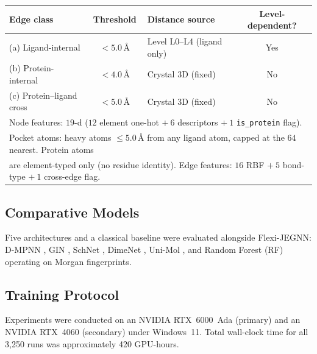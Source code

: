 \documentclass[pdflatex,sn-vancouver-num]{sn-jnl}%
\theoremstyle{thmstyleone}%
\theoremstyle{thmstyletwo}%
\theoremstyle{thmstylethree}%
\renewenvironment{table}[1][htbp]%
{\begin{tableorg}[#1]%
\begin{center}
\begin{adjustbox}{max width=\linewidth}
\begin{threeparttable}
\tablebodyfont%
\renewcommand\footnotetext[2][]{{\removelastskip\vskip3pt%
\let\tablebodyfont\tablefootnotefont%
\hskip0pt\if!##1!\else{\smash{$^{##1}$}}\fi##2\par}}%
}{\end{threeparttable}\end{adjustbox}\end{center}\end{tableorg}}
\begin{document}
\begin{table}[htbp]
  \centering
  \caption{PDBbind protein--ligand complex graph construction.  Only ligand-internal edges (class a) carry level-dependent distances; the pocket and interface use crystal 3D at every level.}
  \label{tab:pdbbind_edges}
  \renewcommand{\arraystretch}{1.25}
  \begin{tabular}{|l|c|l|c|}
    \hline
    \textbf{Edge class} & \textbf{Threshold} & \textbf{Distance source} & \textbf{Level-dependent?} \\
    \hline
    (a) Ligand-internal & $< 5.0$\,\AA & Level L0--L4 (ligand only) & Yes \\
    \hline
    (b) Protein-internal & $< 4.0$\,\AA & Crystal 3D (fixed) & No \\
    \hline
    (c) Protein--ligand cross & $< 5.0$\,\AA & Crystal 3D (fixed) & No \\
    \hline
    \multicolumn{4}{l}{\small Node features: $19$-d ($12$ element one-hot $+\ 6$ descriptors $+\ 1$ \texttt{is\_protein} flag).} \\
    \multicolumn{4}{l}{\small Pocket atoms: heavy atoms $\le 5.0$\,\AA{} from any ligand atom, capped at the $64$ nearest. Protein atoms} \\
    \multicolumn{4}{l}{\small are element-typed only (no residue identity). Edge features: $16$ RBF $+\ 5$ bond-type $+\ 1$ cross-edge flag.} \\
  \end{tabular}
\end{table}

\subsection{Comparative Models}

Five architectures and a classical baseline were evaluated alongside Flexi-JEGNN:
D-MPNN \cite{yang2019dmpnn},
GIN \cite{xu2019gin},
SchNet \cite{schutt2018schnet},
DimeNet \cite{klicpera2020dimenet},
Uni-Mol \cite{zhou2023unimol},
and Random Forest (RF) operating on Morgan fingerprints.

\subsection{Training Protocol}

Experiments were conducted on an NVIDIA RTX~6000~Ada (primary) and an
NVIDIA RTX~4060 (secondary) under Windows~11.  Total wall-clock time
for all 3,250 runs was approximately 420 GPU-hours.
\end{document}
